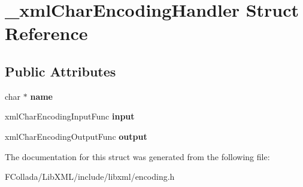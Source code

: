 \hypertarget{struct__xmlCharEncodingHandler}{
\section{\_\-xmlCharEncodingHandler Struct Reference}
\label{struct__xmlCharEncodingHandler}
}
\subsection*{Public Attributes}
\begin{DoxyCompactItemize}
\item 
\hypertarget{struct__xmlCharEncodingHandler_a9cafc98368bd39e4c7db5cd68da1235e}{
char $\ast$ {\bfseries name}}
\label{struct__xmlCharEncodingHandler_a9cafc98368bd39e4c7db5cd68da1235e}

\item 
\hypertarget{struct__xmlCharEncodingHandler_a83ab9925e70e9cf4570e0606e04ce83d}{
xmlCharEncodingInputFunc {\bfseries input}}
\label{struct__xmlCharEncodingHandler_a83ab9925e70e9cf4570e0606e04ce83d}

\item 
\hypertarget{struct__xmlCharEncodingHandler_a0431378526b6f123baa7d15454b7c992}{
xmlCharEncodingOutputFunc {\bfseries output}}
\label{struct__xmlCharEncodingHandler_a0431378526b6f123baa7d15454b7c992}

\end{DoxyCompactItemize}


The documentation for this struct was generated from the following file:\begin{DoxyCompactItemize}
\item 
FCollada/LibXML/include/libxml/encoding.h\end{DoxyCompactItemize}

